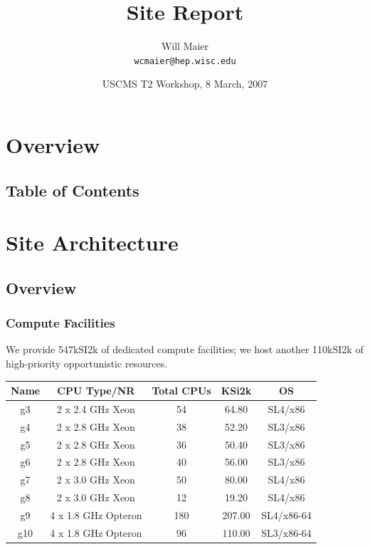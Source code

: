 \documentclass{beamer}
\title{Site Report}
\author[Will Maier]{Will Maier \\ \texttt{wcmaier@hep.wisc.edu}}
\institute[Wisconsin]{University of Wisconsin - High Energy Physics}
\date[8 March, 2007]{USCMS T2 Workshop, 8 March, 2007}
\begin{document}

\begin{frame}
    \titlepage
\end{frame}

\section{Overview}
\subsection{Table of Contents}
\begin{frame}
    \tableofcontents
\end{frame}

\section{Site Architecture}
\subsection{Overview}
\begin{frame}
\frametitle{Compute Facilities}
We provide 547kSI2k of dedicated compute facilities; we host another 110kSI2k 
of high-priority opportunistic resources.

\vspace{.4cm}

\begin{tabular}[c]{|c|c|c|c|c|}
\hline
{\bf Name}   & {\bf CPU Type/NR} & {\bf Total CPUs}  & {\bf KSi2k}   & {\bf OS} \\
\hline
g3  & 2 x 2.4 GHz Xeon      & 54    & 64.80     & SL4/x86 \\
g4  & 2 x 2.8 GHz Xeon      & 38    & 52.20     & SL3/x86 \\
g5  & 2 x 2.8 GHz Xeon      & 36    & 50.40     & SL3/x86 \\
g6  & 2 x 2.8 GHz Xeon      & 40    & 56.00     & SL3/x86 \\
g7  & 2 x 3.0 GHz Xeon      & 50    & 80.00     & SL4/x86 \\
g8  & 2 x 3.0 GHz Xeon      & 12    & 19.20     & SL4/x86 \\
g9  & 4 x 1.8 GHz Opteron   & 180   & 207.00    & SL4/x86-64 \\
g10 & 4 x 1.8 GHz Opteron   & 96    & 110.00    & SL3/x86-64\footnotemark[1] \\
\hline
\end{tabular}
\end{frame}
\end{document}
